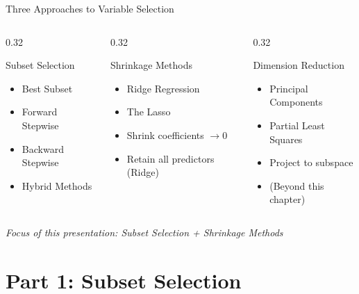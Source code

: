 \documentclass[ignorenonframetext,]{beamer}
\begin{document}
\begin{frame}{Three Approaches to Variable Selection}
\begin{columns}[T]
\begin{column}{0.32\textwidth}
\begin{block}{\small Subset Selection}
\footnotesize
\begin{itemize}
	\item Best Subset
	\item Forward Stepwise
	\item Backward Stepwise
	\item Hybrid Methods
\end{itemize}
\end{block}
\end{column}
\begin{column}{0.32\textwidth}
\begin{block}{\small Shrinkage Methods}
\footnotesize
\begin{itemize}
	\item Ridge Regression
	\item The Lasso
	\item Shrink coefficients $\rightarrow 0$
	\item Retain all predictors (Ridge)
\end{itemize}
\end{block}
\end{column}
\begin{column}{0.32\textwidth}
\begin{block}{\small Dimension Reduction}
\footnotesize
\begin{itemize}
	\item Principal Components
	\item Partial Least Squares
	\item Project to subspace
	\item (Beyond this chapter)
\end{itemize}
\end{block}
\end{column}
\end{columns}

\vspace{12pt}
\centering
{\small\emph{Focus of this presentation: Subset Selection + Shrinkage Methods}}
\end{frame}

\section{Part 1: Subset Selection}
\end{document}
